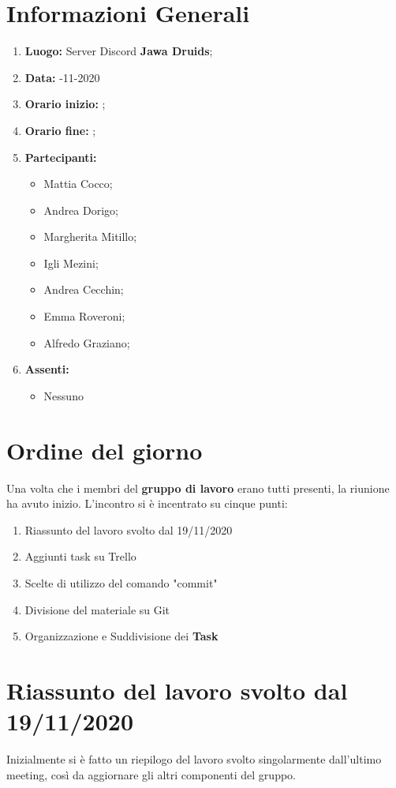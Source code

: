 \newpage
	\section{Informazioni Generali}
	\begin{enumerate}
		\item \textbf{Luogo:} \normalfont Server Discord \textbf{Jawa Druids};
		\item \textbf{Data:} -11-2020
		\item \textbf{Orario inizio:} ;
		\item \textbf{Orario fine:} ;
		\item \textbf{Partecipanti:}
		\begin{itemize}
			\item Mattia Cocco;
			\item Andrea Dorigo;
			\item Margherita Mitillo;
			\item Igli Mezini;
			\item Andrea Cecchin;
			\item Emma Roveroni;
			\item Alfredo Graziano;
		\end{itemize}
		\item \textbf{Assenti:}
		\begin{itemize}
			\item Nessuno
		\end{itemize}
	\end{enumerate}
	\section{Ordine del giorno}	
	Una volta che i membri del \textbf{gruppo di lavoro} erano tutti presenti, la riunione ha avuto inizio.
	L'incontro si è incentrato su cinque punti:
	\begin{enumerate}
		\item Riassunto del lavoro svolto dal 19/11/2020
		\item Aggiunti task su Trello
		\item Scelte di utilizzo del comando "commit"
		\item Divisione del materiale su Git
		\item Organizzazione e Suddivisione dei \textbf{Task}
	\end{enumerate}
	
	\section{Riassunto del lavoro svolto dal 19/11/2020}
	Inizialmente si è fatto un riepilogo del lavoro svolto singolarmente dall'ultimo meeting, così da aggiornare gli altri componenti del gruppo.
	
